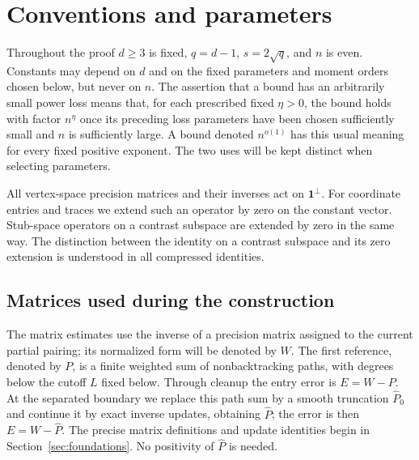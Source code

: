 \section{Conventions and parameters}\label{sec:setup}

Throughout the proof $d\ge3$ is fixed, $q=d-1$, $s=2\sqrt q$, and $n$ is
even.  Constants may depend on $d$ and on the fixed parameters and moment
orders chosen below, but never on $n$.  The assertion that a bound has an
arbitrarily small power loss means that, for each prescribed fixed
$\eta>0$, the bound holds with factor $n^\eta$ once its preceding loss
parameters have been chosen sufficiently small and $n$ is sufficiently
large.  A bound denoted $n^{o(1)}$ has this usual meaning for every fixed
positive exponent.  The two uses will be kept distinct when selecting
parameters.

All vertex-space precision matrices and their inverses act on
$\mathbf1^\perp$.  For coordinate entries and traces we extend such an
operator by zero on the constant vector.  Stub-space operators on a
contrast subspace are extended by zero in the same way.  The distinction
between the identity on a contrast subspace and its zero extension is
understood in all compressed identities.

\subsection{Matrices used during the construction}
The matrix estimates use the inverse of a precision matrix assigned to
the current partial pairing; its normalized form will be denoted by $W$.
The first reference, denoted by $P$, is a finite weighted sum of
nonbacktracking paths, with degrees below the cutoff $L$ fixed below.
Through cleanup the entry error is $E=W-P$. At the separated boundary
we replace this path sum by a smooth truncation $\widehat P_0$ and
continue it by exact inverse updates, obtaining $\widehat P$; the error
is then $E=W-\widehat P$. The precise matrix definitions and update
identities begin in Section~\ref{sec:foundations}. No positivity of
$\widehat P$ is needed.

